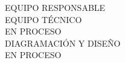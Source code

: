 {\Bold \LARGE EQUIPO RESPONSABLE}\\[2cm]
{\Bold \large \color{color1!89!black} EQUIPO TÉCNICO}\\[0.2cm]
EN PROCESO\\[0.8cm]
{\Bold \large \color{color1!89!black} DIAGRAMACIÓN Y DISEÑO}\\[0.2cm]
EN PROCESO\\[0.8cm]
